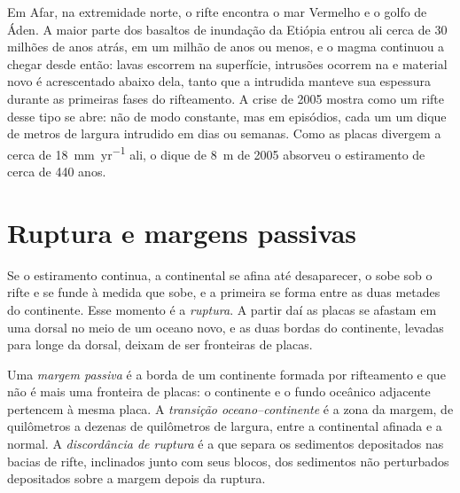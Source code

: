 Em Afar, na extremidade norte, o rifte encontra o mar Vermelho e o golfo de Áden. A maior parte dos basaltos de inundação da Etiópia entrou ali cerca de 30 milhões de anos atrás, em um milhão de anos ou menos, e o magma continuou a chegar desde então: lavas escorrem na superfície, intrusões ocorrem na  e material novo é acrescentado abaixo dela, tanto que a  intrudida manteve sua espessura durante as primeiras fases do rifteamento.
A crise de 2005 mostra como um rifte desse tipo se abre: não de modo constante, mas em episódios, cada um um dique de metros de largura intrudido em dias ou semanas. Como as placas divergem a cerca de \qty{18}{mm.yr^{-1}} ali, o dique de \qty{8}{m} de 2005 absorveu o estiramento de cerca de 440 anos.

\section{Ruptura e margens passivas}

Se o estiramento continua, a  continental se afina até desaparecer, o  sobe sob o rifte e se funde à medida que sobe, e a primeira  se forma entre as duas metades do continente. Esse momento é a \emph{ruptura}. A partir daí as placas se afastam em uma dorsal no meio de um oceano novo, e as duas bordas do continente, levadas para longe da dorsal, deixam de ser fronteiras de placas.

\begin{definition}\label{def:b1:rifts-ridges-margins:passive-margin}
Uma \emph{margem passiva} é a borda de um continente formada por rifteamento e que não é mais uma fronteira de placas: o continente e o fundo oceânico adjacente pertencem à mesma placa. A
\emph{transição oceano--continente} é a zona da margem, de quilômetros a dezenas de quilômetros de largura, entre a  continental afinada e a  normal. A \emph{discordância de ruptura} é a  que separa
os sedimentos depositados nas bacias de rifte, inclinados junto com seus blocos, dos sedimentos não perturbados depositados sobre a margem depois da ruptura.
\end{definition}

